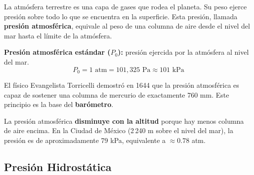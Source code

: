 \begin{seccion}
La atmósfera terrestre es una capa de gases que rodea el planeta. Su peso ejerce presión sobre todo lo que se encuentra en la superficie. Esta presión, llamada \textbf{presión atmosférica}, equivale al peso de una columna de aire desde el nivel del mar hasta el límite de la atmósfera.

\begin{definicion}
\textbf{Presión atmosférica estándar ($P_0$):} presión ejercida por la atmósfera al nivel del mar.
$$P_0 = 1\text{ atm} = 101{,}325\text{ Pa} \approx 101\text{ kPa}$$
\end{definicion}

El físico Evangelista Torricelli demostró en 1644 que la presión atmosférica es capaz de sostener una columna de mercurio de exactamente 760 mm. Este principio es la base del \textbf{barómetro}.

\begin{nota}
La presión atmosférica \textbf{disminuye con la altitud} porque hay menos columna de aire encima. En la Ciudad de México (2\,240 m sobre el nivel del mar), la presión es de aproximadamente 79 kPa, equivalente a $\approx 0.78$ atm.
\end{nota}
\end{seccion}

\subsection{Presión Hidrostática}

